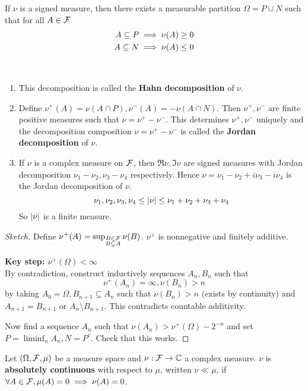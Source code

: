 \documentclass{article}
\begin{document}
\begin{thm}\label{thm:hahn-decomp}
  If $\nu$ is a signed measure, then there exists a measurable partition $\Omega = P \cup N$ such that for all $A \in \mathcal F$
  \begin{align*}
    A \subseteq P & \implies \nu(A) \ge 0 \\
    A \subseteq N & \implies \nu(A) \le 0
  \end{align*}
\end{thm}
\begin{rmks}~
  
  \begin{enumerate}
    \item This decomposition is called the {\bf Hahn decomposition} of $\nu$.
    \item Define $\nu^+(A) = \nu(A \cap P), \nu^-(A) = -\nu(A \cap N)$. Then $\nu^+, \nu^-$ are finite positive measures such that $\nu = \nu^+ - \nu^-$. This determines $\nu^+, \nu^-$ uniquely and the decomposition composition $\nu = \nu^+ - \nu^-$ is called the {\bf Jordan decomposition} of $\nu$.
    \item If $\nu$ is a complex measure on $\mathcal F$, then $\Re\nu, \Im\nu$ are signed measures with Jordan decomposition $\nu_1 - \nu_2, \nu_3 - \nu_4$ respectively. Hence $\nu = \nu_1 - \nu_2 + i\nu_3 - i\nu_4$ is the Jordan decomposition of $\nu$.
    $$\nu_1, \nu_2, \nu_3, \nu_4 \le \left\lvert \nu\right\rvert \le \nu_1 + \nu_2 + \nu_3 + \nu_4$$
    So $\left\lvert \nu\right\rvert$ is a finite measure.
  \end{enumerate}
\end{rmks}
\begin{proof}[Sketch]
  Define $\nu^+(A) = \sup_{\substack{B \in \mathcal F \\ B \subseteq A}} \nu(B)$. $\nu^+$ is nonnegative and finitely additive.

  {\bf Key step: $\nu^+(\Omega) < \infty$} \\
  By contradiction, construct inductively sequences $A_n, B_n$ such that
  $$\nu^+(A_n) = \infty, \nu(B_n) > n$$
  by taking $A_0 = \Omega, B_{n + 1} \subseteq A_n$ such that $\nu(B_n) > n$ (exists by continuity) and $A_{n + 1} = B_{n + 1}$ or $A_n \setminus B_{n + 1}$. This contradicts countable additivity.

  Now find a sequence $A_n$ such that $\nu(A_n) > \nu^+(\Omega) - 2^{-n}$ and set $P = \liminf_n A_n, N = P^c$. Check that this works.
\end{proof}

\newlec

\begin{dfn*}
  Let $(\Omega, \mathcal F, \mu)$ be a measure space and $\nu : \mathcal F \to \mathbb C$ a complex measure. $\nu$ is {\bf absolutely continuous} with respect to $\mu$, written $\nu \ll \mu$, if $\forall A \in \mathcal F, \mu(A) = 0 \implies \nu(A) = 0$.
\end{dfn*}
\end{document}

